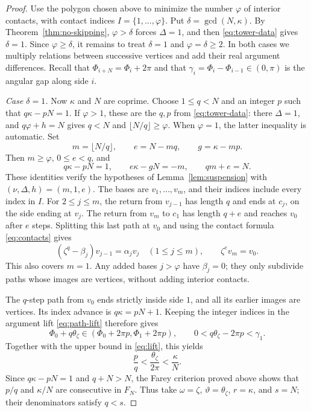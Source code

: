 \documentclass[11pt,a4paper]{article}
\theoremstyle{definition}
\theoremstyle{remark}
\numberwithin{equation}{section}
\begin{document}
\begin{proof}
Use the polygon chosen above to minimize the number $\varphi$ of interior contacts, with contact indices $I=\{1,\ldots,\varphi\}$. Put $\delta=\gcd(N,\kappa)$. By Theorem~\ref{thm:no-skipping}, $\varphi>\delta$ forces $\Delta=1$, and then \eqref{eq:tower-data} gives $\delta=1$. Since $\varphi\ge\delta$, it remains to treat $\delta=1$ and $\varphi=\delta\ge2$. In both cases we multiply relations between successive vertices and add their real argument differences. Recall that $\Phi_{i+N}=\Phi_i+2\pi$ and that $\gamma_i=\Phi_i-\Phi_{i-1}\in(0,\pi)$ is the angular gap along side $i$.

\emph{Case $\delta=1$.} Now $\kappa$ and $N$ are coprime. Choose $1\le q<N$ and an integer $p$ such that $q\kappa-pN=1$. If $\varphi>1$, these are the $q,p$ from \eqref{eq:tower-data}: there $\Delta=1$, and $q\varphi+h=N$ gives $q<N$ and $\lfloor N/q\rfloor\ge\varphi$. When $\varphi=1$, the latter inequality is automatic. Set
\[
 m=\lfloor N/q\rfloor,\qquad e=N-mq,\qquad g=\kappa-mp.
\]
Then $m\ge\varphi$, $0\le e<q$, and
\[
 q\kappa-pN=1,\qquad e\kappa-gN=-m,\qquad qm+e=N.
\]
These identities verify the hypotheses of Lemma~\ref{lem:suspension} with $(\nu,\Delta,h)=(m,1,e)$. The bases are $v_1,\ldots,v_m$, and their indices include every index in $I$. For $2\le j\le m$, the return from $v_{j-1}$ has length $q$ and ends at $c_j$, on the side ending at $v_j$. The return from $v_m$ to $c_1$ has length $q+e$ and reaches $v_0$ after $e$ steps. Splitting this last path at $v_0$ and using the contact formula \eqref{eq:contacts} gives
\begin{equation}\label{eq:successor-product}
 (\zeta^q-\beta_j)v_{j-1}=\alpha_jv_j\quad(1\le j\le m),
 \qquad \zeta^ev_m=v_0.
\end{equation}
This also covers $m=1$. Any added bases $j>\varphi$ have $\beta_j=0$; they only subdivide paths whose images are vertices, without adding interior contacts.

The $q$-step path from $v_0$ ends strictly inside side $1$, and all its earlier images are vertices. Its index advance is $q\kappa=pN+1$. Keeping the integer indices in the argument lift \eqref{eq:path-lift} therefore gives
\[
 \Phi_0+q\theta_\zeta\in(\Phi_0+2\pi p,\Phi_1+2\pi p),
 \qquad 0<q\theta_\zeta-2\pi p<\gamma_1.
\]
Together with the upper bound in \eqref{eq:lift}, this yields
\[
 \frac pq<\frac{\theta_\zeta}{2\pi}<\frac\kappa N.
\]
Since $q\kappa-pN=1$ and $q+N>N$, the Farey criterion proved above shows that $p/q$ and $\kappa/N$ are consecutive in $F_N$. Thus take $\omega=\zeta$, $\vartheta=\theta_\zeta$, $r=\kappa$, and $s=N$; their denominators satisfy $q<s$.


\end{proof}
\end{document}
